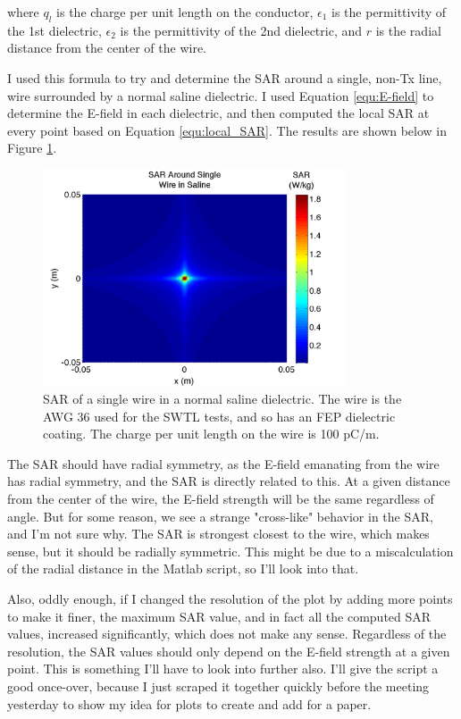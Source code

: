 \documentclass[12pt,onecolumn,titlepage]{article}
\begin{document}
where $q_l$ is the charge per unit length on the conductor, $\epsilon_1$ is the permittivity of the 1st dielectric, $\epsilon_2$ is the permittivity of the 2nd dielectric, and $r$ is the radial distance from the center of the wire. 

I used this formula to try and determine the SAR around a single, non-Tx line, wire surrounded by a normal saline dielectric. I used Equation \ref{equ:E-field} to determine the E-field in each dielectric, and then computed the local SAR at every point based on Equation \ref{equ:local_SAR}. The results are shown below in Figure \ref{fig:SAR_test_single_wire_saline}.



\begin{figure}[htbp]
	\centering
	\includegraphics[width=0.8\textwidth]{Pictures/6Aug2013/SAR_test_single_wire_saline}
	\caption{ SAR of a single wire in a normal saline dielectric. The wire is the AWG 36 used for the SWTL tests, and so has an FEP dielectric coating. The charge per unit length on the wire is 100 pC/m. } 
	\label{fig:SAR_test_single_wire_saline}
\end{figure}



The SAR should have radial symmetry, as the E-field emanating from the wire has radial symmetry, and the SAR is directly related to this. At a given distance from the center of the wire, the E-field strength will be the same regardless of angle. But for some reason, we see a strange "cross-like" behavior in the SAR, and I'm not sure why. The SAR is strongest closest to the wire, which makes sense, but it should be radially symmetric. This might be due to a miscalculation of the radial distance in the Matlab script, so I'll look into that.

Also, oddly enough, if I changed the resolution of the plot by adding more points to make it finer, the maximum SAR value, and in fact all the computed SAR values, increased significantly, which does not make any sense. Regardless of the resolution, the SAR values should only depend on the E-field strength at a given point. This is something I'll have to look into further also. I'll give the script a good once-over, because I just scraped it together quickly before the meeting yesterday to show my idea for plots to create and add for a paper.
\end{document}
